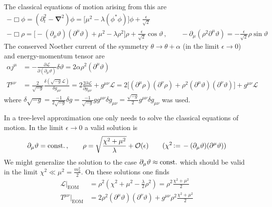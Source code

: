 The classical equations of motion arising from this are
\begin{subequations}
    \begin{gather}
        -\Box\phi=(\partial_t^2-\mathbf{\nabla}^2)\phi=\big[\mu^2-\lambda(\phi^*\phi)\big]\phi+\frac{\epsilon}{\sqrt{2}}\\
        -\Box\rho                                                =\big[-(\partial_\mu\vartheta)(\partial^\mu\vartheta)+\mu^2-\lambda\rho^2\big]\rho+\frac{\epsilon}{\sqrt{2}}\cos\vartheta\,,\qquad-\partial_\mu(\rho^2\partial^\mu\vartheta) =-\frac{\epsilon}{\sqrt{2}}\rho\sin\vartheta
    \end{gather}
\end{subequations}
The conserved Noether current of the symmetry $\theta\to\theta+\alpha$ (in the limit $\epsilon\to 0$) and energy-momentum tensor are
\begin{subequations}
    \begin{align}
        \alpha j^\mu & =-\frac{\partial\mathscr{L}}{\partial(\partial_\mu\vartheta)}\delta\vartheta=2\alpha\rho^2(\partial^\mu\vartheta)                                                                                                                                                             \\
        T^{\mu\nu}   & =\frac{2}{\sqrt{-g}}\frac{\delta(\sqrt{-g}\mathscr{L})}{\delta g_{\mu\nu}}=2\frac{2\partial\mathscr{L}}{\partial g_{\mu\nu}}+g^{\mu\nu}\mathscr{L}=2\big[(\partial^\mu\rho)(\partial^\nu\rho)+\rho^2(\partial^\mu\vartheta)(\partial^\nu\vartheta)\big]+g^{\mu\nu}\mathscr{L}
    \end{align}
\end{subequations}
where $\delta\sqrt{-g}=\frac{-1}{2\sqrt{-g}}\delta g=\frac{-1}{\sqrt{-g}}gg^{\mu\nu}\delta g_{\mu\nu}=\frac{\sqrt{-g}}{2}g^{\mu\nu}\delta g_{\mu\nu}$ was used.

In a tree-level approximation one only needs to solve the classical equations of motion. In the limit $\epsilon\to 0$ a valid solution is
\begin{equation}
    \partial_\mu\vartheta={\text{const.}}\,,\qquad\rho=\sqrt{\frac{\chi^2+\mu^2}{\lambda}}+\mathcal{O}(\epsilon)\qquad(\chi^2{\,\vcentcolon=\,}-(\partial_\mu\vartheta)(\partial^\mu\vartheta))
\end{equation}
We might generalize the solution to the case $\partial_\mu\vartheta\approx{\text{const.}}$ which should be valid in the limit $\chi^2\ll\mu^2=\frac{m_\sigma^2}{2}$. On these solutions one finds
\begin{subequations}
    \begin{align}
        \mathscr{L}\big\vert_{\text{EOM}} & =\rho^2(\chi^2+\mu^2-\frac{\lambda}{2}\rho^2)=\rho^2\frac{\chi^2+\mu^2}{2}                    \\
        T^{\mu\nu}\big\vert_{\text{EOM}}  & =2\rho^2(\partial^\mu\vartheta)(\partial^\nu\vartheta)+g^{\mu\nu}\rho^2\frac{\chi^2+\mu^2}{2}
    \end{align}
\end{subequations}

